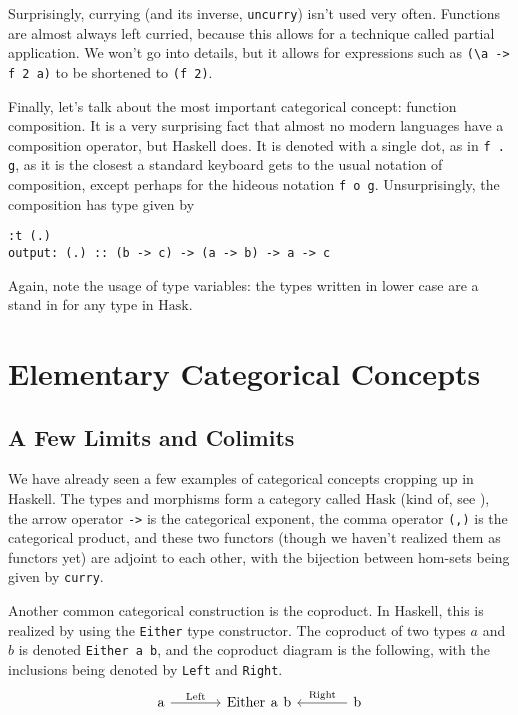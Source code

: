 \documentclass[11pt]{article}
\theoremstyle{nonumberplain}
\newcommand{\Hask}{\mathrm{Hask}}
\newcommand*\lsin{\lstinline}
\newcommand*\lsmath[1]{\text{\lstinline|#1|}}
\begin{document}
Surprisingly, currying (and its inverse, \lsin|uncurry|) isn't used very often. Functions are almost always left curried, because this allows for a technique called partial application. We won't go into details, but it allows for expressions such as \lsin|(\a -> f 2 a)| to be shortened to \lsin|(f 2)|.

Finally, let's talk about the most important categorical concept: function composition. It is a very surprising fact that almost no modern languages have a composition operator, but Haskell does. It is denoted with a single dot, as in \lsin|f . g|, as it is the closest a standard keyboard gets to the usual notation of composition, except perhaps for the hideous notation \lsin|f o g|. Unsurprisingly, the composition has type given by
\begin{lstlisting}
:t (.)
output: (.) :: (b -> c) -> (a -> b) -> a -> c
\end{lstlisting}

Again, note the usage of type variables: the types written in lower case are a stand in for any type in $\Hask$.


\section{Elementary Categorical Concepts}

\subsection{A Few Limits and Colimits}\label{limcolim}

We have already seen a few examples of categorical concepts cropping up in Haskell. The types and morphisms form a category called $\Hask$ (kind of, see \cite{haskisnotcat}), the arrow operator \lsin|->| is the categorical exponent, the comma operator \lsin|(,)| is the categorical product, and these two functors (though we haven't realized them as functors yet) are adjoint to each other, with the bijection between hom-sets being given by \lsin|curry|.

Another common categorical construction is the coproduct. In Haskell, this is realized by using the \lsin|Either| type constructor. The coproduct of two types $a$ and $b$ is denoted \lsin|Either a b|, and the coproduct diagram is the following, with the inclusions being denoted by \lsin|Left| and \lsin|Right|.
\begin{equation}
\begin{tikzcd}[column sep = large]
\lsmath{a} \arrow[r, "\lsmath{Left}"] & \lsmath{Either a b} & \lsmath{b} \arrow[l, "\lsmath{Right}"']
\end{tikzcd}
\end{equation}
\end{document}

